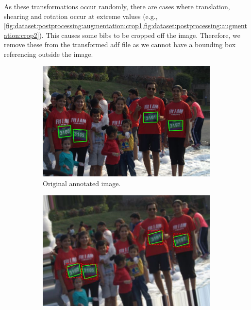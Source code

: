 As these transformations occur randomly, there are cases where translation, shearing and rotation occur at extreme values (e.g., \cref{fig:dataset:postprocessing:augmentation:crop1,fig:dataset:postprocessing:augmentation:crop2}). This causes some bibs to be cropped off the image. Therefore, we remove these from the transformed \gls{adf} file as we cannot have a bounding box referencing outside the image.

\begin{figure}[h!]
  \centering
  \hspace{\fill}
  \begin{subfigure}[b]{0.475\textwidth}
    \includegraphics[width=\textwidth]{images/dataset/augmentation/original}
    \caption{Original annotated image.}
  \end{subfigure}
  \hspace{\fill}
  \begin{subfigure}[b]{0.475\textwidth}
    \includegraphics[width=\textwidth]{images/dataset/augmentation/slight_rotate_blur}

\end{subfigure}
\end{figure}
